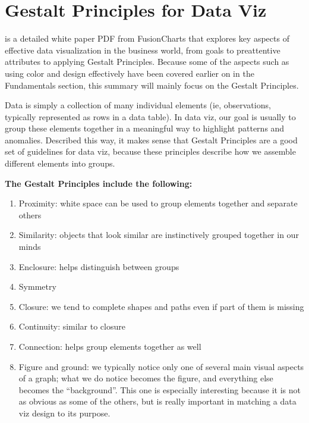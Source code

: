 \documentclass[]{book}
\providecommand{\tightlist}{%
  \setlength{\itemsep}{0pt}\setlength{\parskip}{0pt}}
\theoremstyle{definition}
\theoremstyle{definition}
\theoremstyle{definition}
\theoremstyle{remark}
\begin{document}
\section{Gestalt Principles for Data
Viz}\label{gestalt-principles-for-data-viz}

\citep{principles-fusioncharts} is a detailed white paper PDF from
FusionCharts that explores key aspects of effective data visualization
in the business world, from goals to preattentive attributes to applying
Gestalt Principles. Because some of the aspects such as using color and
design effectively have been covered earlier on in the Fundamentals
section, this summary will mainly focus on the Gestalt Principles.

Data is simply a collection of many individual elements (ie,
observations, typically represented as rows in a data table). In data
viz, our goal is usually to group these elements together in a
meaningful way to highlight patterns and anomalies. Described this way,
it makes sense that Gestalt Principles are a good set of guidelines for
data viz, because these principles describe how we assemble different
elements into groups.

\textbf{The Gestalt Principles include the following:}

\begin{enumerate}
\def\labelenumi{\arabic{enumi}.}
\tightlist
\item
  Proximity: white space can be used to group elements together and
  separate others
\item
  Similarity: objects that look similar are instinctively grouped
  together in our minds
\item
  Enclosure: helps distinguish between groups
\item
  Symmetry
\item
  Closure: we tend to complete shapes and paths even if part of them is
  missing
\item
  Continuity: similar to closure
\item
  Connection: helps group elements together as well
\item
  Figure and ground: we typically notice only one of several main visual
  aspects of a graph; what we do notice becomes the figure, and
  everything else becomes the ``background''. This one is especially
  interesting because it is not as obvious as some of the others, but is
  really important in matching a data viz design to its purpose.
\end{enumerate}
\end{document}
